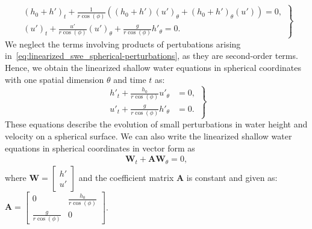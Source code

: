 \begin{equation}\label{eq:linearized_swe_spherical-perturbations}
    \left.
    \begin{aligned}
        {(h_0 + h')}_t + \frac{1}{r \cos (\phi)} \left( (h_0 + h'){(u')}_\theta  + {(h_0 + h')}_\theta(u') \right) = 0, \\
        {(u')}_t + \frac{u'}{r \cos (\phi)} {(u')}_\theta + \frac{g}{r \cos (\phi)} h'_\theta = 0.
    \end{aligned}
    \right\}
\end{equation}
We neglect the terms involving products of pertubations arising in~\eqref{eq:linearized_swe_spherical-perturbations}, as they are second-order terms.
Hence, we obtain the linearized shallow water equations in spherical coordinates with one spatial dimension $\theta$ and time $t$ as:
\begin{equation}\label{eq:linearized_swe_spherical}
    \left.
    \begin{aligned}
        h'_t + \frac{h_0}{r \cos(\phi)} u'_\theta &= 0, \\
        u'_t + \frac{g}{r \cos(\phi)} h'_\theta &= 0.
    \end{aligned}
    \right\}
\end{equation}
These equations describe the evolution of small perturbations in water height and velocity on a spherical surface.
We can also write the linearized shallow water equations in spherical coordinates in vector form as
\begin{align}\label{eq:linearized_swe_spherical_vector}
    \mathbf{W}_t + \mathbf{A} \mathbf{W}_\theta = 0,
\end{align}
where $\mathbf{W} =
\begin{bmatrix} h' \\ u' \end{bmatrix}$ and the coefficient matrix $\mathbf{A}$ is constant and given as:
$\mathbf{A} = \begin{bmatrix} 0 & \frac{h_0}{r \cos(\phi)} \\ \frac{g}{r \cos (\phi)} & 0 \end{bmatrix}$.


